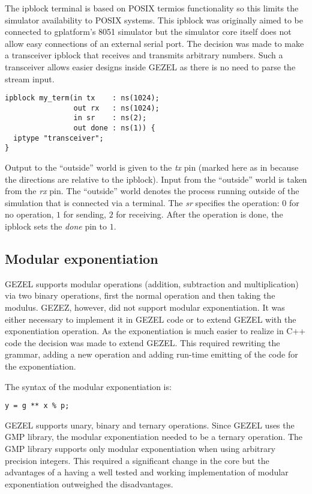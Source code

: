 The ipblock terminal is based on POSIX termios functionality so this
limits the simulator availability to POSIX systems. This ipblock was
originally aimed to be connected to gplatform's 8051 simulator but the
simulator core itself does not allow easy connections of an external
serial port. The decision was made to make a transceiver ipblock that
receives and transmits arbitrary numbers. Such a transceiver allows
easier designs inside GEZEL as there is no need to parse the stream
input.

\begin{lstlisting}[language=GEZEL]
ipblock my_term(in tx    : ns(1024);
                out rx   : ns(1024);
                in sr    : ns(2);
                out done : ns(1)) {
  iptype "transceiver";
}
\end{lstlisting}

Output to the ``outside'' world is given to the \emph{tx} pin (marked
here as in because the directions are relative to the ipblock). Input
from the ``outside'' world is taken from the \emph{rx} pin. The
``outside'' world denotes the process running outside of the
simulation that is connected via a terminal. The \emph{sr} specifies
the operation: $0$ for no operation, $1$ for sending, $2$ for
receiving. After the operation is done, the ipblock sets the
\emph{done} pin to $1$.

\subsection{Modular exponentiation}

GEZEL supports modular operations (addition, subtraction and
multiplication) via two binary operations, first the normal operation
and then taking the modulus. GEZEZ, however, did not support modular
exponentiation. It was either necessary to implement it in GEZEL code
or to extend GEZEL with the exponentiation operation. As the
exponentiation is much easier to realize in C++ code the decision was
made to extend GEZEL. This required rewriting the grammar, adding a
new operation and adding run-time emitting of the code for the
exponentiation.

The syntax of the modular exponentiation is:
\begin{lstlisting}
y = g ** x % p;
\end{lstlisting}

GEZEL supports unary, binary and ternary operations. Since GEZEL uses
the GMP library, the modular exponentiation needed to be a ternary
operation. The GMP library supports only modular exponentiation when
using arbitrary precision integers. This required a significant change
in the core but the advantages of a having a well tested and working
implementation of modular exponentiation outweighed the disadvantages.

